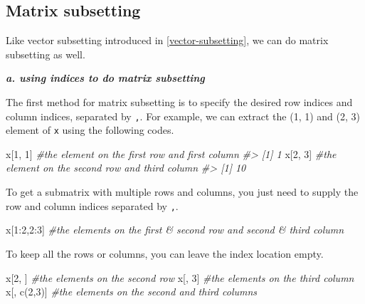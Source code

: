 \documentclass[
]{book}
\newenvironment{Shaded}{\begin{snugshade}}{\end{snugshade}}
\newcommand{\CommentTok}[1]{\textcolor[rgb]{0.56,0.35,0.01}{\textit{#1}}}
\newcommand{\DecValTok}[1]{\textcolor[rgb]{0.00,0.00,0.81}{#1}}
\newcommand{\FunctionTok}[1]{\textcolor[rgb]{0.00,0.00,0.00}{#1}}
\newcommand{\NormalTok}[1]{#1}
\newcommand{\SpecialCharTok}[1]{\textcolor[rgb]{0.00,0.00,0.00}{#1}}
\begin{document}
\hypertarget{matrix-subsetting}{%
\subsection{Matrix subsetting}\label{matrix-subsetting}}

Like vector subsetting introduced in \ref{vector-subsetting}, we can do matrix subsetting as well.

\textbf{\emph{a. using indices to do matrix subsetting}}

The first method for matrix subsetting is to specify the desired row indices and column indices, separated by \texttt{,}. For example, we can extract the (1, 1) and (2, 3) element of \texttt{x} using the following codes.

\begin{Shaded}
\begin{Highlighting}[]
\NormalTok{x[}\DecValTok{1}\NormalTok{, }\DecValTok{1}\NormalTok{]      }\CommentTok{\#the element on the first row and first column}
\CommentTok{\#\textgreater{} [1] 1}
\NormalTok{x[}\DecValTok{2}\NormalTok{, }\DecValTok{3}\NormalTok{]      }\CommentTok{\#the element on the second row and third column}
\CommentTok{\#\textgreater{} [1] 10}
\end{Highlighting}
\end{Shaded}

To get a submatrix with multiple rows and columns, you just need to supply the row and column indices separated by \texttt{,}.

\begin{Shaded}
\begin{Highlighting}[]
\NormalTok{x[}\DecValTok{1}\SpecialCharTok{:}\DecValTok{2}\NormalTok{,}\DecValTok{2}\SpecialCharTok{:}\DecValTok{3}\NormalTok{]   }\CommentTok{\#the elements on the first \& second row and second \& third column}
\end{Highlighting}
\end{Shaded}

To keep all the rows or columns, you can leave the index location empty.

\begin{Shaded}
\begin{Highlighting}[]
\NormalTok{x[}\DecValTok{2}\NormalTok{, ]       }\CommentTok{\#the elements on the second row}
\NormalTok{x[, }\DecValTok{3}\NormalTok{]       }\CommentTok{\#the elements on the third column}
\NormalTok{x[, }\FunctionTok{c}\NormalTok{(}\DecValTok{2}\NormalTok{,}\DecValTok{3}\NormalTok{)]  }\CommentTok{\#the elements on the second and third columns}
\end{Highlighting}
\end{Shaded}
\end{document}
